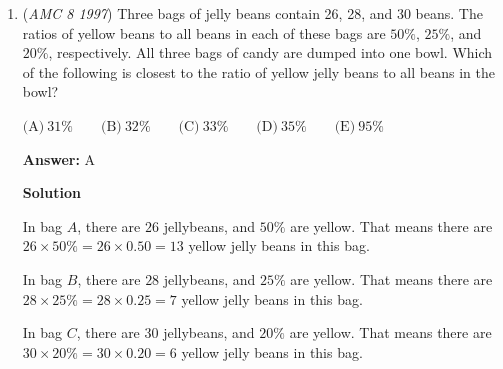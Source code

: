 \begin{enumerate}
\textbf{Solution}

Using the left triangle, we have:

 $\angle 1 + 70 + 40 = 180$
$\angle 1 = 180 - 110$
$\angle 1 = 70$

 Using the given fact that $\angle 1 + \angle 2 = 180$, we have $\angle 2 = 180 - 70 = 110$.

 Finally, using the right triangle, and the fact that $\angle 3 = \angle 4$, we have:

 $\angle 2 + \angle 3 + \angle 4 = 180$
$110 + \angle 3 + \angle 4 = 180$
$110 + \angle 4+ \angle 4 = 180$
$2\angle 4 = 70$
$\angle 4 = 35$

 Thus, the answer is $\boxed{D}$

 \textbf{Side Note to Make Solution Faster} You can use Exterior Angle Theorem to directly say that $\angle 1 = \angle 3+\angle 4$ instead of needing to use up time by doing $\angle 2 + \angle 3 + \angle 4 = 180$, so on. Using exterior angle theorem goes straight to $\angle 1 = \angle 3+\angle 4$, and therefore, $2(\angle 4) = 70^{\circ}$, as we know $180^{\circ}-40^{\circ}-70^{\circ} = \angle 1 = 70^{\circ}$, and $\angle 3 = \angle 4$. This means that $\angle 4 = 35^{\circ}$, so the answer is  $\boxed{D}$.

 


	\item (\textit{AMC 8 1997}) Three bags of jelly beans contain 26, 28, and 30 beans.  The ratios of yellow beans to all beans in each of these bags are $50\%$, $25\%$, and $20\%$, respectively.  All three bags of candy are dumped into one bowl.  Which of the following is closest to the ratio of yellow jelly beans to all beans in the bowl?


 $\text{(A)}\ 31\% \qquad \text{(B)}\ 32\% \qquad \text{(C)}\ 33\% \qquad \text{(D)}\ 35\% \qquad \text{(E)}\ 95\%$

 \textbf{Answer: }A



\textbf{Solution}

In bag $A$, there are $26$ jellybeans, and $50\%$ are yellow.  That means there are $26\times 50\% = 26\times 0.50 = 13$ yellow jelly beans in this bag.

 In bag $B$, there are $28$ jellybeans, and $25\%$ are yellow.  That means there are $28\times 25\% = 28\times 0.25 = 7$ yellow jelly beans in this bag.

 In bag $C$, there are $30$ jellybeans, and $20\%$ are yellow.  That means there are $30\times 20\% = 30\times 0.20 = 6$ yellow jelly beans in this bag.


\end{enumerate}
